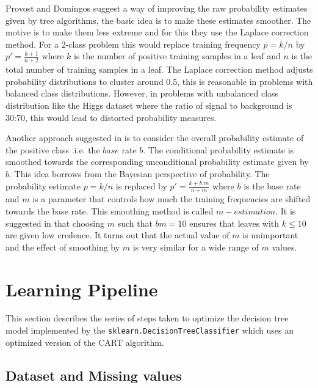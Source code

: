 \documentclass[final,3p,times,twocolumn]{elsarticle}
\begin{document}
Provost and Domingos \cite{PD} suggest a way of improving the raw probability estimates given by tree algorithms, the basic idea is to make these estimates smoother. The motive is to make them less extreme and for this they use the Laplace correction method. For a 2-class problem this would replace training frequency $p = k/n$ by 
$p' = \frac{\displaystyle k + 1}{\displaystyle n +2}$ where $k$ is the number of positive training samples in a leaf and $n$ is the total number of training samples in a leaf. The Laplace correction method adjusts probability distributions to  cluster around 0.5, this is reasonable in problems with balanced class distributions. However, in problems with unbalanced class distribution like the Higgs dataset where the ratio of signal to background is 30:70, this would lead to distorted probability measures. 

Another approach suggested in \cite{CAL} is to consider the overall probability estimate of the positive class .i.e. the $base$ rate $b$. The conditional probability estimate is smoothed towards the corresponding unconditional probability estimate given by $b$. This idea borrows from the Bayesian perspective of probability. The probability estimate $p = k/n$ is replaced by $p' = \frac{\displaystyle k + b.m}{\displaystyle n + m}$ where $b$ is the base rate and $m$ is a parameter that controls how much the training frequencies are shifted towards the base rate. This smoothing method is called $m-estimation$. It is suggested in \cite{CAL} that choosing $m$ such that $bm = 10$ ensures that leaves with $k \leqslant 10$ are given low credence. It turns out that the actual value of $m$ is unimportant and the effect of smoothing by $m$ is very similar for a wide range of $m$ values.   

\section{Learning Pipeline}

This section describes the series of steps taken to optimize the decision tree model implemented by the \texttt{sklearn.DecisionTreeClassifier} which uses an optimized version of the CART algorithm.
 
\label{learning_pipe}

\subsection{Dataset and Missing values}
\end{document}
